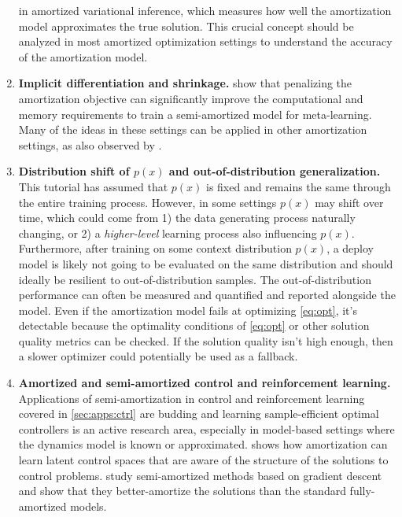 \begin{enumerate}
  in amortized variational inference, which measures how well the
  amortization model approximates the true solution.
  This crucial concept should be analyzed in most amortized
  optimization settings to understand the accuracy of
  the amortization model.
\item \textbf{Implicit differentiation and shrinkage.}
  \citet{chen2019modular,rajeswaran2019meta} show that penalizing
  the amortization objective can significantly improve the
  computational and memory requirements to train a semi-amortized
  model for meta-learning. Many of the ideas in these settings
  can be applied in other amortization settings,
  as also observed by \citet{huszar2019imaml}.
\item \textbf{Distribution shift of $p(x)$ and out-of-distribution generalization.}
  This tutorial has assumed that $p(x)$ is fixed and remains
  the same through the entire training process.
  However, in some settings $p(x)$ may shift over time, which
  could come from 1) the data generating process naturally
  changing, or 2) a \emph{higher-level} learning process
  also influencing $p(x)$.
  Furthermore, after training on some context distribution $p(x)$,
  a deploy model is likely not going to be evaluated on the
  same distribution and should ideally be resilient
  to out-of-distribution samples.
  The out-of-distribution performance can often be measured
  and quantified and reported alongside the model.
  Even if the amortization model fails at optimizing \cref{eq:opt},
  it's detectable because the optimality conditions of
  \cref{eq:opt} or other solution quality metrics can be checked.
  If the solution quality isn't high enough, then a slower
  optimizer could potentially be used as a fallback.
\item \textbf{Amortized and semi-amortized control and reinforcement learning.}
  Applications of semi-amortization in control and reinforcement learning
  covered in \cref{sec:apps:ctrl} are budding and
  learning sample-efficient optimal controllers is
  an active research area, especially in model-based settings
  where the dynamics model is known or approximated.
  \citet{amos2019dcem} shows how amortization can learn latent
  control spaces that are aware of the structure of the
  solutions to control problems.
  \citet{marino2020iterative} study semi-amortized methods
  based on gradient descent and show that they better-amortize
  the solutions than the standard fully-amortized models.
\end{enumerate}

